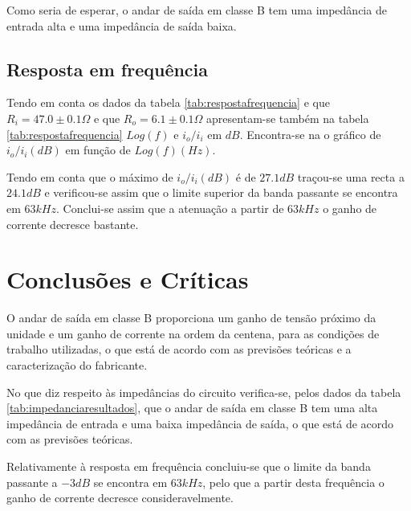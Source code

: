 \documentclass[%
  reprint,
  nofootinbib,
  amsmath,amssymb,
  aps,
  10pt,
  a4paper
]{revtex4-1}
\begin{document}
Como seria de esperar, o andar de saída em classe B tem uma impedância de entrada alta e uma impedância de saída baixa.



\subsection{Resposta em frequência}
Tendo em conta os dados da tabela \ref{tab:respostafrequencia} e que $R_i=47.0 \pm 0.1 \Omega$ e que $R_o=6.1 \pm 0.1 \Omega$ apresentam-se também na tabela \ref{tab:respostafrequencia} $Log(f)$ e $i_o / i_i $ em $dB$. Encontra-se na   o gráfico de $i_o/i_i (dB)$ em função de $Log(f) (Hz)$.

Tendo em conta que o máximo de  $i_o/i_i (dB)$ é de $27.1 dB$ traçou-se uma recta a $24.1 dB$ e verificou-se assim que o limite superior da banda passante se encontra em $63kHz$. Conclui-se assim que a atenuação a partir de $63kHz$ o ganho de corrente decresce bastante.



\section{Conclusões e Críticas}
\label{s:conclu}
O andar de saída em classe B proporciona um ganho de tensão próximo da unidade e um ganho de corrente na ordem da centena, para as condições de trabalho utilizadas, o que está de acordo com as previsões teóricas e a caracterização do fabricante.

No que diz respeito às impedâncias do circuito verifica-se, pelos dados da tabela \ref{tab:impedanciaresultados}, que o andar de saída em classe B tem uma alta impedância de entrada e uma baixa impedância de saída, o que está de acordo com as previsões teóricas. 

Relativamente à resposta em frequência concluiu-se que o limite da banda passante a $-3dB$ se encontra em $63kHz$, pelo que a partir desta frequência o ganho de corrente decresce consideravelmente.



\nocite{*}
{}
\end{document}

